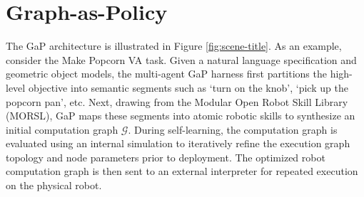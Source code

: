 




\section{Graph-as-Policy}
\label{sec:design}
The GaP architecture is illustrated in Figure \ref{fig:scene-title}.  As an example, consider the Make Popcorn VA task. Given a natural language specification and geometric object models, the multi-agent GaP harness first partitions the high-level objective into semantic segments such as ‘turn on the knob’, ‘pick up the popcorn pan’, etc. Next, drawing from the Modular Open Robot Skill Library (MORSL), GaP maps these segments into atomic robotic skills to synthesize an initial computation graph $\mathcal{G}$.  During self-learning, the computation graph is evaluated using an internal simulation to iteratively refine the execution graph topology and node parameters prior to deployment. The optimized robot computation graph is then sent to an external interpreter for repeated execution on the physical robot.

